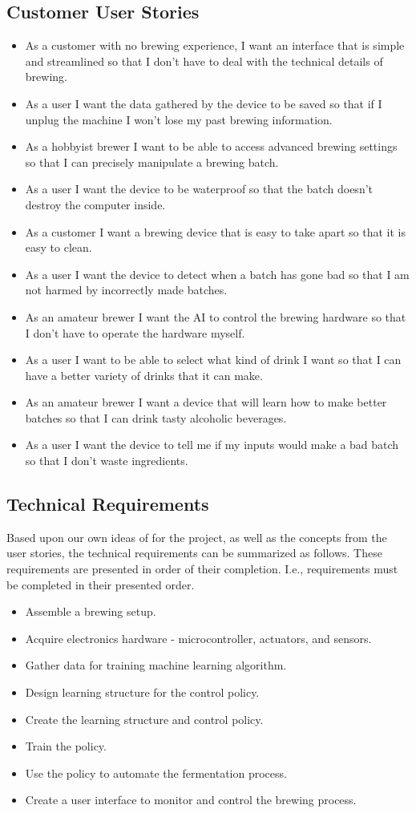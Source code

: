 \documentclass[draftclsnofoot,onecolumn,letterpaper,10pt]{IEEEtran}
\begin{document}
\subsection{Customer User Stories}
\begin{itemize}
	\item As a customer with no brewing experience, I want an interface that is simple and streamlined so that I don't have to deal with the technical details of brewing.
	\item As a user I want the data gathered by the device to be saved so that if I unplug the machine I won't lose my past brewing information.
	\item As a hobbyist brewer I want to be able to access advanced brewing settings so that I can precisely manipulate a brewing batch.
	\item As a user I want the device to be waterproof so that the batch doesn't destroy the computer inside.
	\item As a customer I want a brewing device that is easy to take apart so that it is easy to clean.
	\item As a user I want the device to detect when a batch has gone bad so that I am not harmed by incorrectly made batches.
	\item As an amateur brewer I want the AI to control the brewing hardware so that I don't have to operate the hardware myself.
	\item As a user I want to be able to select what kind of drink I want so that I can have a better variety of drinks that it can make.
	\item As an amateur brewer I want a device that will learn how to make better batches so that I can drink tasty alcoholic beverages.
	\item As a user I want the device to tell me if my inputs would make a bad batch so that I don't waste ingredients.
\end{itemize}
\subsection{Technical Requirements}
Based upon our own ideas of for the project, as well as the concepts from the user stories, the technical requirements can be summarized as follows.
These requirements are presented in order of their completion.
I.e., requirements must be completed in their presented order.
\begin{itemize}
	\item Assemble a brewing setup.
	\item Acquire electronics hardware - microcontroller, actuators, and sensors.
	\item Gather data for training machine learning algorithm.
	\item Design learning structure for the control policy.
	\item Create the learning structure and control policy.
	\item Train the policy.
	\item Use the policy to automate the fermentation process.
	\item Create a user interface to monitor and control the brewing process.
\end{itemize}
\end{document}
